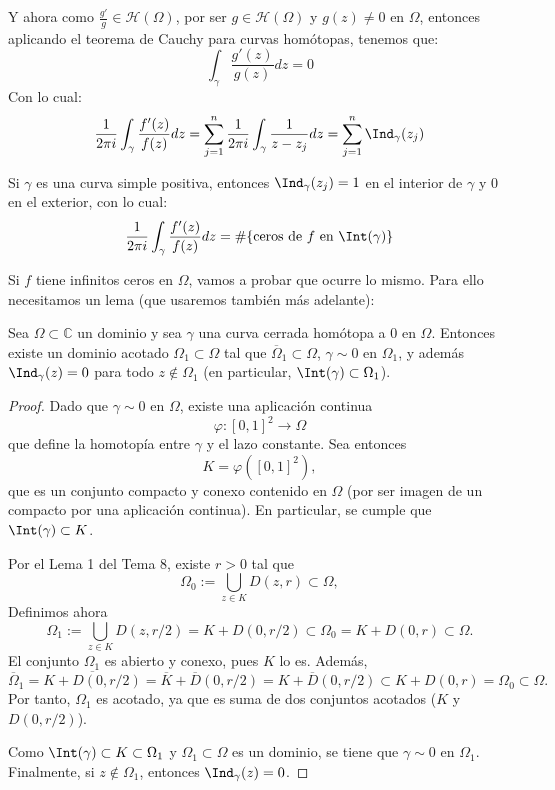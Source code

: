 Y ahora como $\frac{g'}{g} \in \mathcal{H}(\Omega)$, por ser $g \in \mathcal{H}(\Omega)$ y $g(z) \neq 0$ en $\Omega$, entonces aplicando el teorema de Cauchy para curvas homótopas, tenemos que:
\[
\int_\gamma \frac{g'(z)}{g(z)} dz = 0
\]
Con lo cual:
\[
\frac{1}{2 \pi i} \int_\gamma \frac{f'(z)}{f(z)} dz =
\sum_{j=1}^{n} \frac{1}{2 \pi i} \int_\gamma \frac{1}{z-z_j} dz =
\sum_{j=1}^{n} \Ind_\gamma (z_j)
\]

Si $\gamma$ es una curva simple positiva, entonces $\Ind_\gamma(z_j) = 1$ en el interior de $\gamma$ y 0 en el exterior, con lo cual:
\[
\frac{1}{2 \pi i} \int_\gamma \frac{f'(z)}{f(z)} dz =
\# \{ \text{ceros de } f \text{ en } \Int(\gamma) \}
\]

Si $f$ tiene infinitos ceros en $\Omega$, vamos a probar que ocurre lo mismo. Para ello necesitamos un lema (que usaremos también más adelante):

\begin{lema}
    Sea $\Omega \subset \mathbb{C}$ un dominio y sea $\gamma$ una curva cerrada homótopa a $0$ en $\Omega$. Entonces existe un dominio acotado $\Omega_1 \subset \Omega$ tal que $\overline{\Omega}_1 \subset \Omega$, $\gamma \sim 0$ en $\Omega_1$, y además $\Ind_\gamma(z) = 0$ para todo $z \notin \Omega_1$ (en particular, $\Int(\gamma) \subset \Omega_1$).
\end{lema}

\begin{proof}
    Dado que $\gamma \sim 0$ en $\Omega$, existe una aplicación continua 
    \[
        \varphi : [0,1]^2 \to \Omega
    \]
    que define la homotopía entre $\gamma$ y el lazo constante. Sea entonces 
    \[
        K = \varphi([0,1]^2),
    \]
    que es un conjunto compacto y conexo contenido en $\Omega$ (por ser imagen de un compacto por una aplicación continua). En particular, se cumple que $\Int(\gamma) \subset K$.

    Por el Lema 1 del Tema 8, existe $r > 0$ tal que
    \[
        \Omega_0 := \bigcup_{z \in K} D(z,r) \subset \Omega,
    \]
    Definimos ahora
    \[
        \Omega_1 := \bigcup_{z \in K} D(z, r/2) = K + D(0, r/2) \subset \Omega_0 = K + D(0,r) \subset \Omega.
    \]
    El conjunto $\Omega_1$ es abierto y conexo, pues $K$ lo es. Además,
    \[
        \overline{\Omega}_1 
        = \overline{K + D(0, r/2)} 
        = \overline{K} + \overline{D}(0, r/2)
        = K + \overline{D}(0, r/2)
        \subset K + D(0, r) 
        = \Omega_0 
        \subset \Omega.
    \]
    Por tanto, $\Omega_1$ es acotado, ya que es suma de dos conjuntos acotados ($K$ y $D(0, r/2)$).

    Como $\Int(\gamma) \subset K \subset \Omega_1$ y $\Omega_1 \subset \Omega$ es un dominio, se tiene que $\gamma \sim 0$ en $\Omega_1$. Finalmente, si $z \notin \Omega_1$, entonces $\Ind_\gamma(z) = 0$.
\end{proof}


